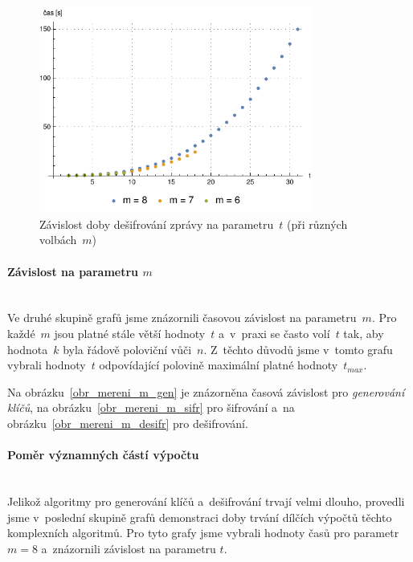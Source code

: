 \documentclass[thesis=M,czech,hidelinks]{FITthesis}[2012/06/26]
\newcommand{\0}{{\textcolor[gray]{0.75}{0}}}
\begin{document}
\begin{figure}[!ht]
    \centering
    \includegraphics[width=0.8\textwidth]{../implementace/grafy/listplot_m6-8_desifrovani.pdf}
    \caption[Časová složitost dešifrování]{
        Závislost doby dešifrování zprávy na parametru~$t$
        (při různých volbách~$m$)
    }
    \label{obr_mereni_t_desifr}
\end{figure}

\clearpage

\paragraph{Závislost na parametru $m$} \hfil \\
Ve druhé skupině grafů jsme znázornili časovou závislost na parametru~$m$. Pro
každé~$m$ jsou platné stále větší hodnoty~$t$ a~v~praxi se často volí~$t$ tak,
aby hodnota~$k$ byla řádově poloviční vůči~$n$. Z~těchto důvodů jsme v~tomto
grafu vybrali hodnoty~$t$ odpovídající polovině maximální platné
hodnoty~$t_{max}$.

Na obrázku~\ref{obr_mereni_m_gen} je znázorněna časová závislost pro
\emph{generování klíčů}, na obrázku~\ref{obr_mereni_m_sifr} pro šifrování a~na
obrázku~\ref{obr_mereni_m_desifr} pro dešifrování.


\paragraph{Poměr významných částí výpočtu} \hfil \\
Jelikož algoritmy pro generování klíčů a~dešifrování trvají velmi dlouho,
provedli jsme v~poslední skupině grafů demonstraci doby trvání dílčích výpočtů
těchto komplexních algoritmů. Pro tyto grafy jsme vybrali hodnoty časů pro
parametr $m=8$ a~znázornili závislost na parametru $t$.
\end{document}

